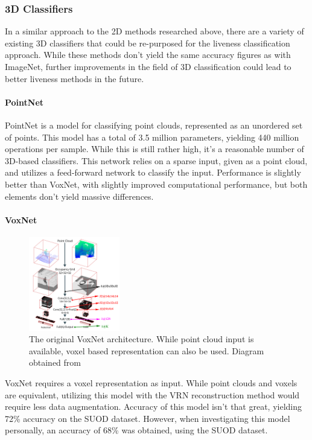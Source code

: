 \documentclass[12pt,a4paper]{article}
\begin{document}
        \subsubsection{3D Classifiers}
            

            In a similar approach to the 2D methods researched above, there are a variety of existing 3D classifiers that could be re-purposed for the liveness classification approach.
            While these methods don't yield the same accuracy figures as with ImageNet, further improvements in the field of 3D classification could lead to better liveness methods in the future.
         
            \paragraph{PointNet}
            PointNet is a model for classifying point clouds, represented as an unordered set of points. This model has a total of 3.5 million parameters, yielding 440 million operations per sample. 
            While this is still rather high, it's a reasonable number of 3D-based classifiers. This network relies on a sparse input, given as a point cloud, and utilizes a feed-forward network to classify the input.
            Performance is slightly better than VoxNet, with slightly improved computational performance, but both elements don't yield massive differences. \cite{PointNet}
            
           
            \paragraph{VoxNet}
            \begin{figure}
                \centering
                \includegraphics[width=150px]{VoxNetArchitecture.png}
                \caption{The original VoxNet architecture. While point cloud input is available, voxel based representation can also be used. Diagram obtained from \cite{VoxNetModel}}
                \label{OriginalVoxNetArchitecture}
            \end{figure}
            VoxNet requires a voxel representation as input. While point clouds and voxels are equivalent, utilizing this model with the VRN reconstruction method would require less data augmentation. Accuracy of this model isn't that great, yielding 72\% accuracy on the SUOD dataset. \cite{VoxNetModel} However, when investigating this model personally, an accuracy of 68\% was obtained, using the SUOD dataset. 
\end{document}
